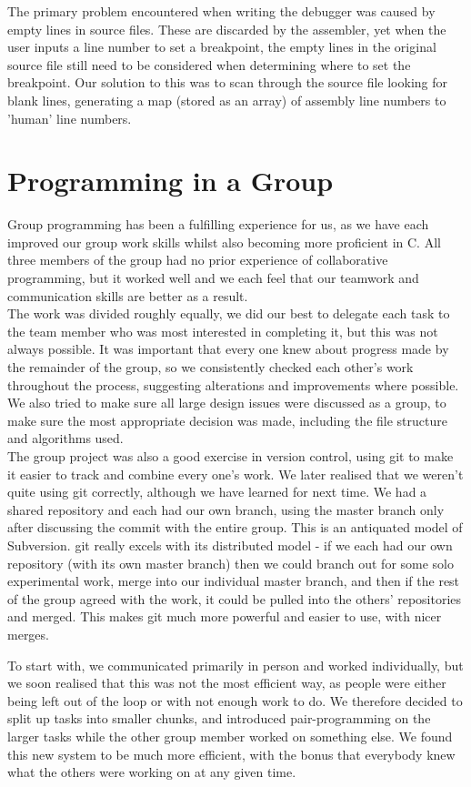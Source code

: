 \documentclass[11pt]{report}
\begin{document}
The primary problem encountered when writing the debugger was caused by empty
lines in source files. These are discarded by the assembler, yet when the user
inputs a line number to set a breakpoint, the empty lines in the original source
file still need to be considered when determining where to set the breakpoint.
Our solution to this was to scan through the source file looking for blank lines,
generating a map (stored as an array) of assembly line numbers to 'human' line
numbers.

\section*{Programming in a Group}

Group programming has been a fulfilling experience for us, as we have each
improved our group work skills whilst also becoming more proficient in C. All
three members of the group had no prior experience of collaborative programming,
but it worked well and we each feel that our teamwork and communication skills
are better as a result.
\\[2ex]
The work was divided roughly equally,  we did our best to delegate each task to the team
member who was most interested in completing it, but this was not always possible. It 
was important that every one knew about progress made by the remainder of the group, so we
consistently checked each other's work throughout the process, suggesting
alterations and improvements where possible. We also tried to make sure all large design
issues were discussed as a group, to make sure the most appropriate decision was
made, including the file structure and algorithms used. 
\\[2ex]
The group project was also a good exercise in version control, using git to make
it easier to track and combine every one's work. We later realised that we
weren't quite using git correctly, although we have learned for next time. We
had a shared repository and each had our own branch, using the master branch
only after discussing the commit with the entire group. This is an antiquated
model of Subversion. git really excels with its distributed model - if we each
had our own repository (with its own master branch) then we could branch out for
some solo experimental work, merge into our individual master branch, and then
if the rest of the group agreed with the work, it could be pulled into the others' repositories 
and merged. This makes git much more powerful and easier to use, with nicer merges.

\newpage

To start with, we communicated primarily in person and worked individually, but
we soon realised that this was not the most efficient way, as people were either
being left out of the loop or with not enough work to do. We therefore decided to
split up tasks into smaller chunks, and introduced pair-programming on the larger
tasks while the other group member worked on something else. We found this new
system to be much more efficient, with the bonus that everybody knew what the
others were working on at any given time.
\end{document}
